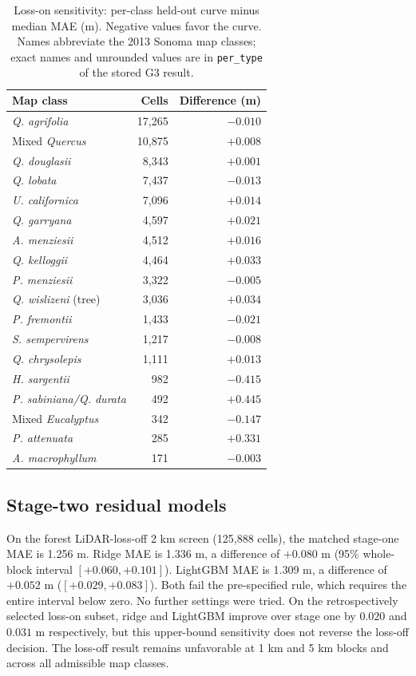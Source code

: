 \documentclass[11pt]{article}
\begin{document}
\begin{table}[ht]
\centering
\footnotesize
\caption{Loss-on sensitivity: per-class held-out curve minus median
MAE (m). Negative values favor the curve. Names abbreviate the
2013 Sonoma map classes; exact names and unrounded values are in
\texttt{per\_type} of the stored G3 result.}
\label{tab:curve-class}
\begin{tabular}{lrr}
\toprule
Map class & Cells & Difference (m) \\
\midrule
\emph{Q. agrifolia} & 17,265 & $-0.010$ \\
Mixed \emph{Quercus} & 10,875 & $+0.008$ \\
\emph{Q. douglasii} & 8,343 & $+0.001$ \\
\emph{Q. lobata} & 7,437 & $-0.013$ \\
\emph{U. californica} & 7,096 & $+0.014$ \\
\emph{Q. garryana} & 4,597 & $+0.021$ \\
\emph{A. menziesii} & 4,512 & $+0.016$ \\
\emph{Q. kelloggii} & 4,464 & $+0.033$ \\
\emph{P. menziesii} & 3,322 & $-0.005$ \\
\emph{Q. wislizeni} (tree) & 3,036 & $+0.034$ \\
\emph{P. fremontii} & 1,433 & $-0.021$ \\
\emph{S. sempervirens} & 1,217 & $-0.008$ \\
\emph{Q. chrysolepis} & 1,111 & $+0.013$ \\
\emph{H. sargentii} & 982 & $-0.415$ \\
\emph{P. sabiniana/Q. durata} & 492 & $+0.445$ \\
Mixed \emph{Eucalyptus} & 342 & $-0.147$ \\
\emph{P. attenuata} & 285 & $+0.331$ \\
\emph{A. macrophyllum} & 171 & $-0.003$ \\
\bottomrule
\end{tabular}
\end{table}

\subsection{Stage-two residual models}
On the forest LiDAR-loss-off 2 km screen (125,888 cells), the matched
stage-one MAE is 1.256 m. Ridge MAE is 1.336 m, a difference of
$+0.080$ m (95\% whole-block interval $[+0.060,+0.101]$). LightGBM
MAE is 1.309 m, a difference of $+0.052$ m ($[+0.029,+0.083]$).
Both fail the pre-specified rule, which requires the entire interval
below zero. No further settings were tried. On the retrospectively
selected loss-on subset, ridge and LightGBM improve over stage one by
$0.020$ and $0.031$ m respectively, but this upper-bound sensitivity
does not reverse the loss-off decision. The loss-off result remains
unfavorable at 1 km and 5 km blocks and across all admissible map
classes.
\end{document}
